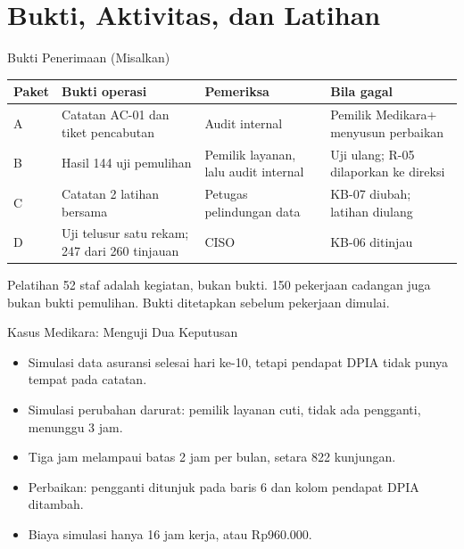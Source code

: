 \documentclass[aspectratio=169, table, 12pt]{beamer}
\begin{document}
\section{Bukti, Aktivitas, dan Latihan}

\begin{frame}{{\Large Bukti Penerimaan (Misalkan)}}
  \vspace{2pt}
  \scriptsize
  \begin{tabularx}{\textwidth}{|>{\raggedright\arraybackslash}p{}|>{\raggedright\arraybackslash}X|>{\raggedright\arraybackslash}p{}|>{\raggedright\arraybackslash}X|}
    \hline
    \textbf{Paket} & \textbf{Bukti operasi} & \textbf{Pemeriksa} & \textbf{Bila gagal} \\ \hline
    A & Catatan AC-01 dan tiket pencabutan & Audit internal & Pemilik Medikara+ menyusun perbaikan
    \\ \hline
    B & Hasil 144 uji pemulihan & Pemilik layanan, lalu audit internal & Uji ulang; R-05 dilaporkan
    ke direksi \\ \hline
    C & Catatan 2 latihan bersama & Petugas pelindungan data & KB-07 diubah; latihan diulang \\
    \hline
    D & Uji telusur satu rekam; 247 dari 260 tinjauan & CISO & KB-06 ditinjau \\ \hline
  \end{tabularx}

  \vspace{6pt}
  \small Pelatihan 52 staf adalah kegiatan, bukan bukti. 150 pekerjaan cadangan juga bukan bukti
  pemulihan. Bukti ditetapkan sebelum pekerjaan dimulai.
\end{frame}

\begin{frame}{{\Large Kasus Medikara: Menguji Dua Keputusan}}
  \vspace{6pt}
  \small
  \begin{itemize}
    \item Simulasi data asuransi selesai hari ke-10, tetapi pendapat DPIA tidak punya tempat pada
          catatan.
    \item Simulasi perubahan darurat: pemilik layanan cuti, tidak ada pengganti, menunggu 3 jam.
    \item Tiga jam melampaui batas 2 jam per bulan, setara 822 kunjungan.
    \item Perbaikan: pengganti ditunjuk pada baris 6 dan kolom pendapat DPIA ditambah.
    \item Biaya simulasi hanya 16 jam kerja, atau Rp960.000.
  \end{itemize}
\end{frame}
\end{document}
